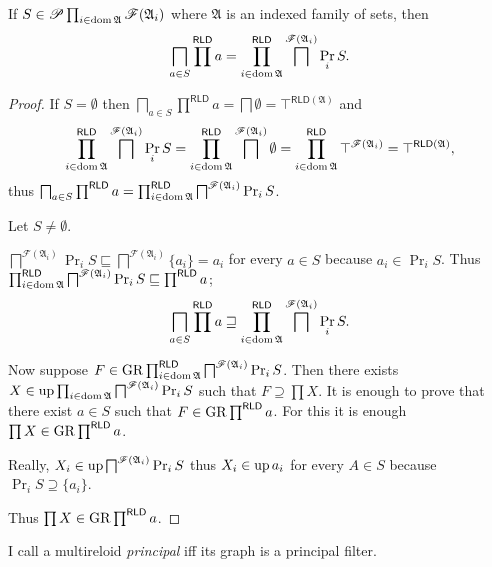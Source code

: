 \begin{thm}
If $S\in\mathscr{P}\prod_{i\in\operatorname{dom}\mathfrak{A}}\mathscr{F}(\mathfrak{A}_{i})$
where $\mathfrak{A}$ is an indexed family of sets, then 
\[
\bigsqcap_{a\in S}\prod^{\mathsf{RLD}}a=\prod_{i\in\operatorname{dom}\mathfrak{A}}^{\mathsf{RLD}}\bigsqcap^{\mathscr{F}(\mathfrak{A}_{i})}\Pr_{i}S.
\]
\end{thm}
\begin{proof}
If $S=\emptyset$ then $\bigsqcap_{a\in S}\prod^{\mathsf{RLD}}a=\bigsqcap\emptyset=\top^{\mathsf{RLD}(\mathfrak{A})}$
and 
\[
\prod_{i\in\operatorname{dom}\mathfrak{A}}^{\mathsf{RLD}}\bigsqcap^{\mathscr{F}(\mathfrak{A}_{i})}\Pr_{i}S=
\prod_{i\in\operatorname{dom}\mathfrak{A}}^{\mathsf{RLD}}\bigsqcap^{\mathscr{F}(\mathfrak{A}_{i})}\emptyset=\prod_{i\in\operatorname{dom}\mathfrak{A}}^{\mathsf{RLD}}\top^{\mathscr{F}(\mathfrak{A}_{i})}=\top^{\mathsf{RLD}(\mathfrak{A})},
\]
thus $\bigsqcap_{a\in S}\prod^{\mathsf{RLD}}a=\prod_{i\in\operatorname{dom}\mathfrak{A}}^{\mathsf{RLD}}\bigsqcap^{\mathscr{F}(\mathfrak{A}_{i})}\Pr_{i}S$.

Let $S\ne\emptyset$.

$\bigsqcap^{\mathscr{F}(\mathfrak{A}_{i})}\Pr_{i}S\sqsubseteq\bigsqcap^{\mathscr{F}(\mathfrak{A}_{i})}\{a_{i}\}=a_{i}$
for every $a\in S$ because $a_{i}\in\Pr_{i}S$. Thus $\prod_{i\in\operatorname{dom}\mathfrak{A}}^{\mathsf{RLD}}\bigsqcap^{\mathscr{F}(\mathfrak{A}_{i})}\Pr_{i}S\sqsubseteq\prod^{\mathsf{RLD}}a$;
\[
\bigsqcap_{a\in S}\prod^{\mathsf{RLD}}a\sqsupseteq\prod_{i\in\operatorname{dom}\mathfrak{A}}^{\mathsf{RLD}}\bigsqcap^{\mathscr{F}(\mathfrak{A}_{i})}\Pr_{i}S.
\]


Now suppose $F\in\operatorname{GR}\prod_{i\in\operatorname{dom}\mathfrak{A}}^{\mathsf{RLD}}\bigsqcap^{\mathscr{F}(\mathfrak{A}_{i})}\Pr_{i}S$.
Then there exists $X\in\operatorname{up}\prod_{i\in\operatorname{dom}\mathfrak{A}}\bigsqcap^{\mathscr{F}(\mathfrak{A}_{i})}\Pr_{i}S$
such that $F\supseteq\prod X$. It is enough to prove that there exist
$a\in S$ such that $F\in\operatorname{GR}\prod^{\mathsf{RLD}}a$. For this it is
enough $\prod X\in\operatorname{GR}\prod^{\mathsf{RLD}}a$.

Really, $X_{i}\in\operatorname{up}\bigsqcap^{\mathscr{F}(\mathfrak{A}_{i})}\Pr_{i}S$
thus $X_{i}\in\operatorname{up} a_{i}$ for every $A\in S$ because $\Pr_{i}S\supseteq\{a_{i}\}$.

Thus $\prod X\in\operatorname{GR}\prod^{\mathsf{RLD}}a$.\end{proof}
\begin{defn}
I call a multireloid \emph{principal}
iff its graph is a principal filter.
\end{defn}

